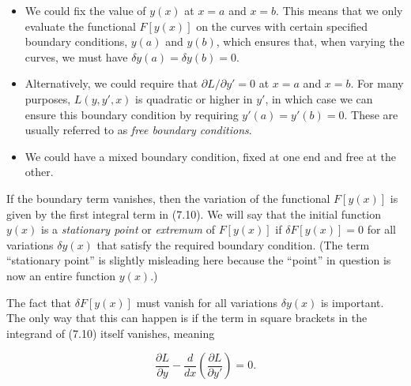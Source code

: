 \documentclass[11pt,a4paper,twoside]{article}
\newcommand{\pnum}[1]{\makebox[0pt][r]{\scriptsize\textbf{[#1]}\hspace{0.7em}}}
\begin{document}
\begin{itemize}

    \item \pnum{11}We could fix the value of $y(x)$ at $x=a$ and $x=b$. This means that we only evaluate the functional $F[y(x)]$ on the curves with certain specified boundary conditions, $y(a)$ and $y(b)$, which ensures that, when varying the curves, we must have $\delta y(a)=\delta y(b)=0$.

    \item \pnum{12}Alternatively, we could require that $\partial L/\partial y'=0$ at $x=a$ and $x=b$. For many purposes, $L(y,y',x)$ is quadratic or higher in $y'$, in which case we can ensure this boundary condition by requiring $y'(a)=y'(b)=0$. These are usually referred to as \textit{free boundary conditions}.

    \item \pnum{13}We could have a mixed boundary condition, fixed at one end and free at the other.

\end{itemize}

\noindent\pnum{14}If the boundary term vanishes, then the variation of the functional $F[y(x)]$ is given by the first integral term in (7.10). We will say that the initial function $y(x)$ is a \textit{stationary point} or \textit{extremum} of $F[y(x)]$ if $\delta F[y(x)]=0$ for all variations $\delta y(x)$ that satisfy the required boundary condition. (The term ``stationary point'' is slightly misleading here because the ``point'' in question is now an entire function $y(x)$.)



\noindent\pnum{15}The fact that $\delta F[y(x)]$ must vanish for all variations $\delta y(x)$ is important. The only way that this can happen is if the term in square brackets in the integrand of (7.10) itself vanishes, meaning

\begin{equation}
    \frac{\partial L}{\partial y}-\frac{d}{dx}\left(\frac{\partial L}{\partial y'}\right)=0.\tag{7.11}
\end{equation}



\end{document}

